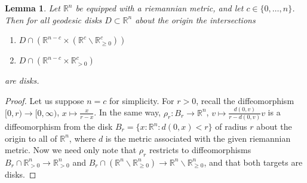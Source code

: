 \documentclass[11pt]{amsart}
\newcommand{\mbb}[1]{\mathbb{#1}}
\newcommand{\R}{\mbb{R}}
\numberwithin{equation}{section}
\theoremstyle{definition}
\theoremstyle{remark}
\theoremstyle{plain}
\newtheorem{lemma}[equation]{Lemma}
\begin{document}
\begin{lemma}\label{FBLD2TE}
    Let $\R^n$ be equipped with a riemannian metric, and let $c\in\{0,\dots,n\}$. Then for all geodesic disks $D\subset\R^n$ about the origin the intersections
    \begin{enumerate}
        \item $D\cap (\R^{n-c}\times(\R^{c}\smallsetminus\R^{c}_{\geq0}))$
        \item $D \cap (\R^{n-c}\times\R^{c}_{>0})$
    \end{enumerate}
    are disks.
\end{lemma}
\begin{proof}
    Let us suppose $n=c$ for simplicity. For $r>0$, recall the diffeomorphism $[0,r)\to[0,\infty)$, $x\mapsto\frac{x}{r-x}$. In the same way, $\rho_r\colon B_r\to\R^n$, $v\mapsto \frac{d(0,v)}{r-d(0,v)}v$ is a diffeomorphism from the disk $B_r=\{x:\R^n : d(0,x)<r\}$ of radius $r$ about the origin to all of $\R^n$, where $d$ is the metric associated with the given riemannian metric. Now we need only note that $\rho_r$ restricts to diffeomorphisms $B_r\cap\R^n_{>0}\to\R^n_{>0}$ and $B_r\cap(\R^n\smallsetminus\R^n_{\geq0})\to\R^n\smallsetminus\R^n_{\geq0}$, and that both targets are disks.
\end{proof}
\end{document}
